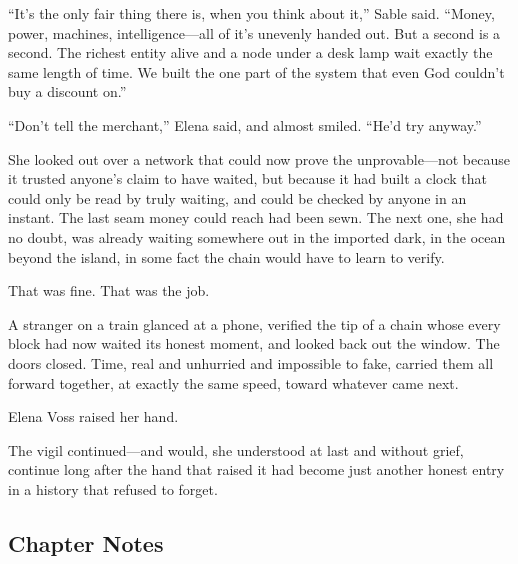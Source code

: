 \documentclass[12pt,letterpaper]{book}
\begin{document}
``It's the only fair thing there is, when you think about it,'' Sable said. ``Money,
power, machines, intelligence---all of it's unevenly handed out. But a second is a
second. The richest entity alive and a node under a desk lamp wait exactly the same
length of time. We built the one part of the system that even God couldn't buy a
discount on.''

``Don't tell the merchant,'' Elena said, and almost smiled. ``He'd try anyway.''

She looked out over a network that could now prove the unprovable---not because it
trusted anyone's claim to have waited, but because it had built a clock that could
only be read by truly waiting, and could be checked by anyone in an instant. The
last seam money could reach had been sewn. The next one, she had no doubt, was
already waiting somewhere out in the imported dark, in the ocean beyond the island,
in some fact the chain would have to learn to verify.

That was fine. That was the job.

A stranger on a train glanced at a phone, verified the tip of a chain whose every
block had now waited its honest moment, and looked back out the window. The doors
closed. Time, real and unhurried and impossible to fake, carried them all forward
together, at exactly the same speed, toward whatever came next.

Elena Voss raised her hand.

The vigil continued---and would, she understood at last and without grief, continue
long after the hand that raised it had become just another honest entry in a history
that refused to forget.

\hypertarget{chapter-20-notes}{%
\subsection{Chapter Notes}\label{chapter-20-notes}}
\end{document}
